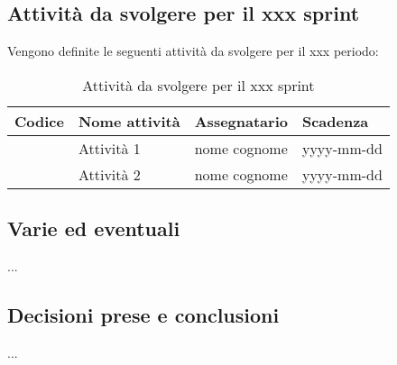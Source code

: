 \documentclass[italian,12pt]{article}
\begin{document}
\subsection{Attività da svolgere per il xxx sprint} %
Vengono definite le seguenti attività da svolgere per il xxx periodo: %
\begin{table}[!h]
	\centering
	\begin{tabular}{ |l||l|l|l| }
		\hline
		\textbf{Codice}          & \textbf{Nome attività} & \textbf{Assegnatario} & \textbf{Scadenza} \\
		\hline
		\mySkip[86bz7hfte]       & Attività 1             & nome cognome          & yyyy-mm-dd        \\
		\mySkip[86bz7hfte]       & Attività 2             & nome cognome          & yyyy-mm-dd        \\
		\hline
	\end{tabular}
	\caption{Attività da svolgere per il xxx sprint} %
\end{table}

\subsection{Varie ed eventuali}
...

\subsection{Decisioni prese e conclusioni}
...
\end{document}
